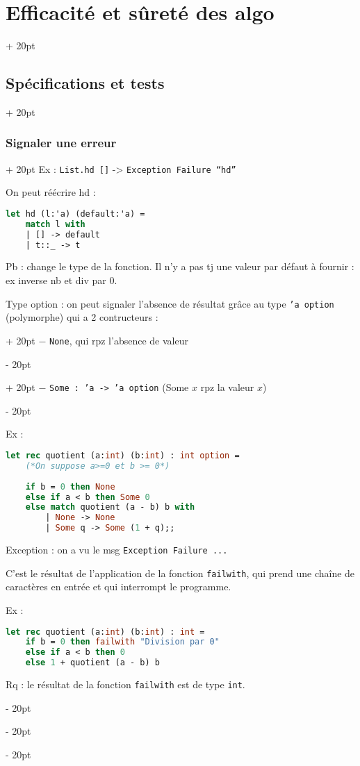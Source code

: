 \documentclass[a4paper, 12pt, twoside]{article}
\newcommand{\ind}[1][20pt]{\advance\leftskip + #1}
\newcommand{\deind}[1][20pt]{\advance\leftskip - #1}
\newcommand{\indented}[2][20pt]{\par \ind[#1] #2 \par \deind[#1]}
\newenvironment{indentedenv}[1][20pt]{\par \ind[#1]}{\par \deind}
\newenvironment{indt}[2][20pt]{#2 \begin{indentedenv}[#1]}{\end{indentedenv}} %
\begin{document}
\begin{indt}{\section{Efficacité et sûreté des algo}}
\begin{indt}{\subsection{Spécifications et tests}}
\begin{indt}{\subsubsection{Signaler une erreur}}
                Ex :
                \texttt{List.hd []} -> \texttt{Exception Failure ``hd''}
                
                On peut réécrire hd :
                \begin{lstlisting}[language=Caml, xleftmargin=80pt]
let hd (l:'a) (default:'a) =
    match l with
    | [] -> default
    | t::_ -> t
                \end{lstlisting}
                
                Pb : change le type de la fonction. Il n'y a pas tj une valeur par défaut à fournir : ex inverse nb et div par 0.
                
                Type option : on peut  signaler l'absence de résultat grâce au type \texttt{'a option} (polymorphe) qui a 2 contructeurs :
                
                \indented{$-$ \texttt{None}, qui rpz l'absence de valeur}
                \indented{$-$ \texttt{Some : 'a -> 'a option} (Some $x$ rpz la valeur $x$)}
                
                Ex :
                
                \begin{lstlisting}[language=Caml, xleftmargin=80pt]
let rec quotient (a:int) (b:int) : int option =
    (*On suppose a>=0 et b >= 0*)
    
    if b = 0 then None
    else if a < b then Some 0
    else match quotient (a - b) b with
        | None -> None
        | Some q -> Some (1 + q);;
                \end{lstlisting}
                
                
                Exception : on a vu le msg \texttt{Exception Failure ...}
                
                C'est le résultat de l'application de la fonction \texttt{failwith}, qui prend une chaîne de caractères en entrée et qui interrompt le programme.
                
                Ex :
                
                \begin{lstlisting}[language=Caml, xleftmargin=80pt]
let rec quotient (a:int) (b:int) : int =
    if b = 0 then failwith "Division par 0"
    else if a < b then 0
    else 1 + quotient (a - b) b
                \end{lstlisting}
                
                Rq : le résultat de la fonction \texttt{failwith} est de type \texttt{int}.
                

\end{indt}
\end{indt}
\end{indt}
\end{document}
